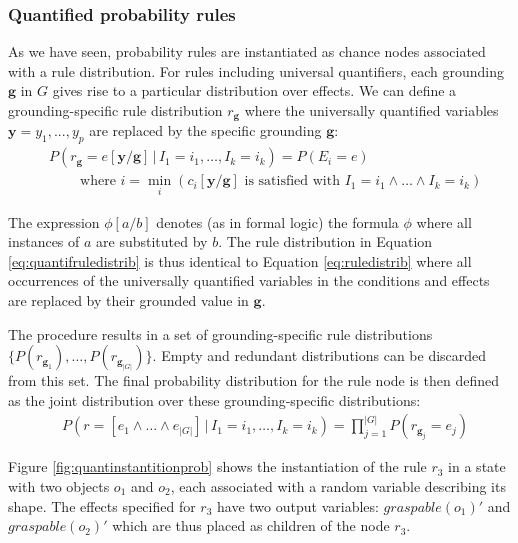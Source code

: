 
\subsubsection*{Quantified probability rules}

As we have seen, probability rules are instantiated as chance nodes associated with a rule distribution.  For rules including universal quantifiers, each grounding $\mathbf{g}$ in $G$ gives rise to a particular distribution over effects.   We can define a grounding-specific rule distribution $r_{\mathbf{g}}$ where the universally quantified variables $\mathbf{y} = y_1,..., y_p$ are replaced by the specific grounding $\mathbf{g}$:
\begin{align}
& P(r_{\mathbf{g}}\!=\!e [\mathbf{y} / \mathbf{g}] \, | \, I_1\!=\!i_1, \dots, I_k\!=\!i_k) = P(E_i = e) \label{eq:quantifruledistrib}
 \\
& \; \; \; \; \; \; \; \; \text{where } i = \min_i (c_i[\mathbf{y} / \mathbf{g}]\text{ is satisfied with } I_1\!=\!i_1 \land \dots \land I_k\!=\!i_k) \nonumber \end{align}

The expression $\phi[a/b]$ denotes (as in formal logic) the formula $\phi$ where all instances of $a$ are substituted by $b$. The rule distribution in Equation \eqref{eq:quantifruledistrib} is thus identical to Equation \eqref{eq:ruledistrib} where all occurrences of the universally quantified variables in the conditions and effects are replaced by their grounded value in $\mathbf{g}$.

The procedure results in a set of grounding-specific rule distributions $ \{ P(r_{\mathbf{g}_1}), \dots, P(r_{\mathbf{g}_{|G|}}) \}$. Empty and redundant distributions can be discarded from this set. The final probability distribution for the rule node is then defined as the joint distribution over these grounding-specific distributions: 
\begin{align}
& P(r\!=\![e_1 \land \dots \land e_{|G|}] \, | \, I_1\!=\!i_1, \dots, I_k\!=\!i_k) = \prod_{j=1}^{|G|} P(r_{\mathbf{g}_j}\!=\!e_j) \label{eq:quantifruledistrib2}
\end{align}


Figure \ref{fig:quantinstantitionprob} shows the instantiation of the rule $r_3$ in a state with two objects $o_1$ and $o_2$, each associated with a random variable describing its shape. The effects specified for $r_3$ have two output variables: $\mathit{graspable}(o_1)'$ and $\mathit{graspable}(o_2)'$ which are thus placed as children of the node $r_3$.  

